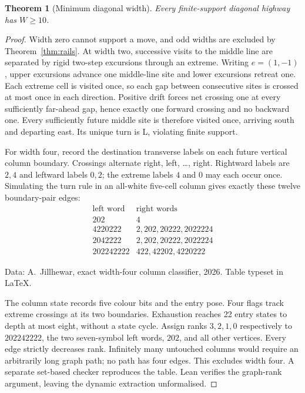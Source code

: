 \documentclass[11pt,letterpaper]{article}
\newtheorem{theorem}{Theorem}[section]
\newcommand{\graphiccredit}[1]{\par\noindent #1\par\medskip}
\begin{document}
\begin{theorem}[Minimum diagonal width]\label{thm:width}
Every finite-support diagonal highway has $W\ge10$.
\end{theorem}
\begin{proof}
Width zero cannot support a move, and odd widths are excluded by
Theorem~\ref{thm:rails}. At width two, successive visits to the middle
line are separated by rigid two-step excursions through an extreme.
Writing $e=(1,-1)$, upper excursions advance one middle-line site and
lower excursions retreat one. Each extreme cell is visited once, so
each gap between consecutive sites is crossed at most once in each
direction. Positive drift forces net crossing one at every sufficiently
far-ahead gap, hence exactly one forward crossing and no backward one.
Every sufficiently future middle site is therefore visited once, arriving
south and departing east. Its unique turn is L, violating finite support.

For width four, record the destination transverse labels on each future
vertical column boundary. Crossings alternate right, left, \ldots,
right. Rightward labels are $2,4$ and leftward labels $0,2$; the extreme
labels $4$ and $0$ may each occur once. Simulating the turn rule in an all-white five-cell column gives exactly
these twelve boundary-pair edges:
\[
\begin{array}{c|l}
\text{left word}&\text{right words}\\\hline
202&4\\
4220222&2,202,20222,2022224\\
2042222&2,202,20222,2022224\\
202242222&422,42202,4220222
\end{array}
\]
\graphiccredit{Data: A.\ Jillhewar, exact width-four column classifier,
2026. Table typeset in LaTeX.}
The column state records five colour bits and the entry pose. Four flags
track extreme crossings at its two boundaries. Exhaustion reaches
22 entry states to depth at most eight, without a state cycle. Assign ranks
$3,2,1,0$ respectively to $202242222$, the two seven-symbol left
words, $202$, and all other vertices. Every edge strictly decreases
rank. Infinitely many untouched columns would require an arbitrarily
long graph path; no path has four edges. This excludes width four.
A separate set-based checker reproduces the table. Lean verifies the
graph-rank argument, leaving the dynamic extraction unformalised.


\end{proof}
\end{document}
